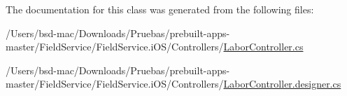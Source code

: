 The documentation for this class was generated from the following files\+:\begin{DoxyCompactItemize}
\item 
/\+Users/bsd-\/mac/\+Downloads/\+Pruebas/prebuilt-\/apps-\/master/\+Field\+Service/\+Field\+Service.\+i\+O\+S/\+Controllers/\hyperlink{_labor_controller_8cs}{Labor\+Controller.\+cs}\item 
/\+Users/bsd-\/mac/\+Downloads/\+Pruebas/prebuilt-\/apps-\/master/\+Field\+Service/\+Field\+Service.\+i\+O\+S/\+Controllers/\hyperlink{_labor_controller_8designer_8cs}{Labor\+Controller.\+designer.\+cs}\end{DoxyCompactItemize}
